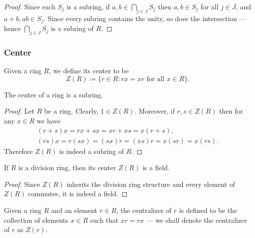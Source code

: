 %
\begin{proof}
Since each \(S_j\) is a subring, if \(a, b \in \bigcap_{j \in J} S_j\) then \(a,
b \in S_j\) for all \(j \in J\), and \(a + b, a b \in S_j\). Since every subring
contains the unity, so does the intersection --- hence \(\bigcap_{j \in J} S_j\)
is a subring of \(R\).
\end{proof}
%


\subsubsection{Center}

%
\begin{definition}[Center]
\label{def:ring-center}
Given a ring \(R\), we define its center to be
\[
Z(R) \coloneq \{r \in R \colon r x = x r \text{ for all } x \in R\}.
\]
\end{definition}
%

%
\begin{corollary}
\label{cor:center-is-subring}
The center of a ring is a subring.
\end{corollary}
%

%
\begin{proof}
Let \(R\) be a ring. Clearly, \(1 \in Z(R)\). Moreover, if \(r, s \in Z(R)\)
then for any \(x \in R\) we have
\begin{gather*}
(r + s) x = r x + s x = x r + x s = x (r + s), \\
(r s) x = r(s x) = (s x) r = (x s) r = x (s r) = x (r s).
\end{gather*}
Therefore \(Z(R)\) is indeed a subring of \(R\).
\end{proof}
%

%
\begin{corollary}
\label{cor:division-ring-center-is-field}
If \(R\) is a division ring, then its center \(Z(R)\) is a field.
\end{corollary}
%

%
\begin{proof}
Since \(Z(R)\) inherits the division ring structure and every element of
\(Z(R)\) commutes, it is indeed a field.
\end{proof}
%

%
\begin{definition}[Centralizer]
\label{def:ring-centralizer}
Given a ring \(R\) and an element \(r \in R\), the centralizer of \(r\) is
defined to be the collection of elements \(x \in R\) such that \(x r = r x\) ---
we shall denote the centralizer of \(r\) as \(Z(r)\).
\end{definition}
%

